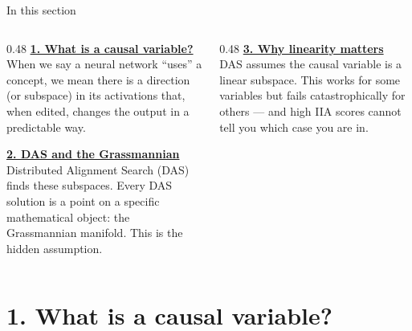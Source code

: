 \documentclass[aspectratio=169,11pt]{beamer}
\begin{document}
\begin{frame}{In this section}
\begin{columns}[T]
\begin{column}{0.48\textwidth}
\textbf{\hyperlink{sec1}{1. What is a causal variable?}}\\[0.2em]
{\small When we say a neural network ``uses'' a concept, we mean there is a direction (or subspace) in its activations that, when edited, changes the output in a predictable way.}

\vspace{0.6em}
\textbf{\hyperlink{sec2}{2. DAS and the Grassmannian}}\\[0.2em]
{\small Distributed Alignment Search (DAS) finds these subspaces. Every DAS solution is a point on a specific mathematical object: the Grassmannian manifold. This is the hidden assumption.}
\end{column}
\begin{column}{0.48\textwidth}
\textbf{\hyperlink{sec3}{3. Why linearity matters}}\\[0.2em]
{\small DAS assumes the causal variable is a linear subspace. This works for some variables but fails catastrophically for others --- and high IIA scores cannot tell you which case you are in.}
\end{column}
\end{columns}
\end{frame}


\hypertarget{sec1}{}
\section{1. What is a causal variable?}

\end{document}
